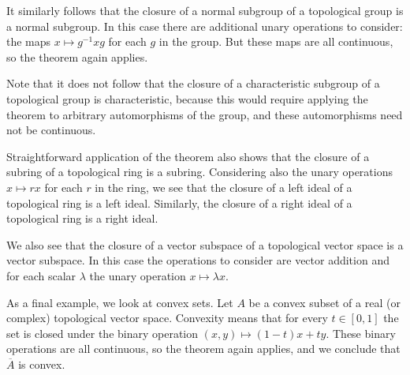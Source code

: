 \documentclass[12pt]{article}
\def\closure{\overline}
\begin{document}
It similarly follows that the closure of a normal subgroup 
of a topological group is a normal subgroup.
In this case there are additional unary operations to consider:
the maps $x\mapsto g^{-1}xg$ for each $g$ in the group.
But these maps are all continuous, so the theorem again applies.

Note that it does not follow that the closure of a characteristic subgroup
of a topological group is characteristic,
because this would require applying the theorem 
to arbitrary automorphisms of the group,
and these automorphisms need not be continuous.

Straightforward application of the theorem also shows that
the closure of a subring of a topological ring is a subring.
Considering also the unary operations $x\mapsto rx$ for each $r$ in the ring,
we see that the closure of a left ideal of a topological ring is a left ideal.
Similarly, the closure of a right ideal of a topological ring is a right ideal.

We also see that
the closure of a vector subspace of a topological vector space
is a vector subspace.
In this case the operations to consider are vector addition
and for each scalar $\lambda$ the unary operation $x\mapsto\lambda x$.

As a final example, we look at convex sets.
Let $A$ be a convex subset of a real (or complex) topological vector space.
Convexity means that for every $t\in[0,1]$ 
the set is closed under the binary operation $(x,y)\mapsto(1-t)x+ty$.
These binary operations are all continuous,
so the theorem again applies, and we conclude that $\closure{A}$ is convex.

\end{document}
